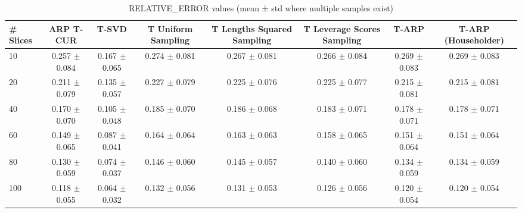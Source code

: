 \begin{table}
\caption{RELATIVE_ERROR values (mean ± std where multiple samples exist)}
\label{tab:relative_error}
\begin{tabular}{lccccccc}
\toprule
# Slices & ARP T-CUR & T-SVD & T Uniform Sampling & T Lengths Squared Sampling & T Leverage Scores Sampling & T-ARP & T-ARP (Householder) \\
\midrule
10 & 0.257 $\pm$ 0.084 & 0.167 $\pm$ 0.065 & 0.274 $\pm$ 0.081 & 0.267 $\pm$ 0.081 & 0.266 $\pm$ 0.084 & 0.269 $\pm$ 0.083 & 0.269 $\pm$ 0.083 \\
20 & 0.211 $\pm$ 0.079 & 0.135 $\pm$ 0.057 & 0.227 $\pm$ 0.079 & 0.225 $\pm$ 0.076 & 0.225 $\pm$ 0.077 & 0.215 $\pm$ 0.081 & 0.215 $\pm$ 0.081 \\
40 & 0.170 $\pm$ 0.070 & 0.105 $\pm$ 0.048 & 0.185 $\pm$ 0.070 & 0.186 $\pm$ 0.068 & 0.183 $\pm$ 0.071 & 0.178 $\pm$ 0.071 & 0.178 $\pm$ 0.071 \\
60 & 0.149 $\pm$ 0.065 & 0.087 $\pm$ 0.041 & 0.164 $\pm$ 0.064 & 0.163 $\pm$ 0.063 & 0.158 $\pm$ 0.065 & 0.151 $\pm$ 0.064 & 0.151 $\pm$ 0.064 \\
80 & 0.130 $\pm$ 0.059 & 0.074 $\pm$ 0.037 & 0.146 $\pm$ 0.060 & 0.145 $\pm$ 0.057 & 0.140 $\pm$ 0.060 & 0.134 $\pm$ 0.059 & 0.134 $\pm$ 0.059 \\
100 & 0.118 $\pm$ 0.055 & 0.064 $\pm$ 0.032 & 0.132 $\pm$ 0.056 & 0.131 $\pm$ 0.053 & 0.126 $\pm$ 0.056 & 0.120 $\pm$ 0.054 & 0.120 $\pm$ 0.054 \\
\bottomrule
\end{tabular}
\end{table}
